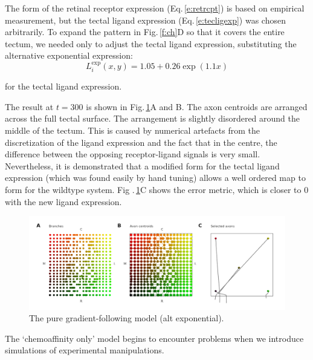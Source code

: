 \documentclass[11pt, a4paper]{article}
\begin{document}
The form of the retinal receptor expression (Eq.\,\ref{e:retrcpt}) is based on
empirical measurement, but the tectal ligand expression
(Eq.\,\ref{e:tecligexp}) was chosen arbitrarily. To expand the pattern in
Fig.\,\ref{f:ch}D so that it covers the entire tectum, we needed only to
adjust the tectal ligand expression, substituting the alternative exponential
expression:
%
\begin{equation} \label{e:tecligexp2}
L_i^{\text{exp}}(x,y) = 1.05 + 0.26 \exp(1.1 x)
\end{equation}

for the tectal ligand expression.

The result at $t=300$ is shown in Fig.\,\ref{f:chalt}A and B. The axon
centroids are arranged across the full tectal surface.  The arrangement is
slightly disordered around the middle of the tectum. This is caused by
numerical artefacts from the discretization of the ligand expression and the
fact that in the centre, the difference between the opposing receptor-ligand
signals is very small. Nevertheless, it is demonstrated that a modified form
for the tectal ligand expression (which was found easily by hand tuning)
allows a well ordered map to form for the wildtype system. Fig
.\,\ref{f:chalt}C shows the error metric, which is closer to 0 with the new
ligand expression.

\begin{figure}
\includegraphics[width=\linewidth]{./images/j4_eE_G_wt_fig3.png}
\caption{The pure gradient-following model (alt exponential).}
\label{f:chalt}
\end{figure}

The `chemoaffinity only' model begins to encounter problems when we introduce
simulations of experimental manipulations.
\end{document}
